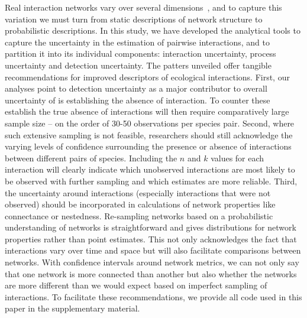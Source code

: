 \documentclass[12pt]{article}
\begin{document}
\begin{spacing}{2.0}
  Real interaction networks vary over several dimensions~\citep{Kitching1987,Olesen2011a,Pires2011a,Baiser2012,Fodrie2015,Novak2015}, and to capture this variation we must turn from static descriptions of network structure to probabilistic descriptions. In this study, we have developed the analytical tools to capture the uncertainty in the estimation of pairwise interactions, and to partition it into its individual components: interaction uncertainty, process uncertainty and detection uncertainty. The patters unveiled offer tangible recommendations for improved descriptors of ecological interactions. First, our analyses point to detection uncertainty as a major contributor to overall uncertainty of is establishing the absence of interaction. To counter these establish the true absence of interactions will then require comparatively large sample size – on the order of 30-50 observations per species pair. Second, where such extensive sampling is not feasible, researchers should still acknowledge the varying levels of confidence surrounding the presence or absence of interactions between different pairs of species. Including the $n$ and $k$ values for each interaction will clearly indicate which unobserved interactions are most likely to be observed with further sampling and which estimates are more reliable. Third, the uncertainty around interactions (especially interactions that were not observed) should be incorporated in calculations of network properties like connectance or nestedness. Re-sampling networks based on a probabilistic understanding of networks is straightforward and gives distributions for network properties rather than point estimates. This not only acknowledges the fact that interactions vary over time and space but will also facilitate comparisons between networks. With confidence intervals around network metrics, we can not only say that one network is more connected than another but also whether the networks are more different than we would expect based on imperfect sampling of interactions. To facilitate these recommendations, we provide all code used in this paper in the supplementary material. 



\end{spacing}
\end{document}
